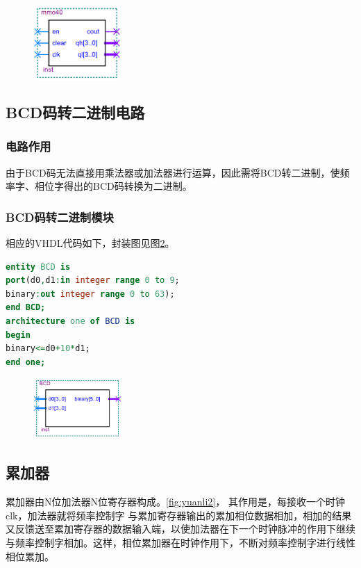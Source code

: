 \documentclass[12pt]{article}
\begin{document}
\begin{figure}[hp]
	\centering  
	\includegraphics[width=0.3\textwidth]{picture/mo40fz.png} 
	\caption{}
	\label{fig:fengzhuangmo40}   
\end{figure}
\subsection{BCD码转二进制电路}
\subsubsection{电路作用}
由于BCD码无法直接用乘法器或加法器进行运算，因此需将BCD转二进制，使频率字、相位字得出的BCD码转换为二进制。
\subsubsection{BCD码转二进制模块}
相应的VHDL代码如下，封装图见图\ref{fig:fengzhuangBCD}。
\begin{lstlisting}[language=VHDL]
entity BCD is
port(d0,d1:in integer range 0 to 9;
binary:out integer range 0 to 63);
end BCD;
architecture one of BCD is
begin
binary<=d0+10*d1;
end one;
\end{lstlisting}
\begin{figure}[hp]
	\centering  
	\includegraphics[width=0.3\textwidth]{picture/bcd.png} 
	\caption{}
	\label{fig:fengzhuangBCD}   
\end{figure}
\subsection{累加器}
累加器由N位加法器N位寄存器构成。\ref{fig:yuanli2}，
其作用是，每接收一个时钟clk，加法器就将频率控制字 与累加寄存器输出的累加相位数据相加，相加的结果又反馈送至累加寄存器的数据输入端，以使加法器在下一个时钟脉冲的作用下继续与频率控制字相加。这样，相位累加器在时钟作用下，不断对频率控制字进行线性相位累加。
\end{document}

